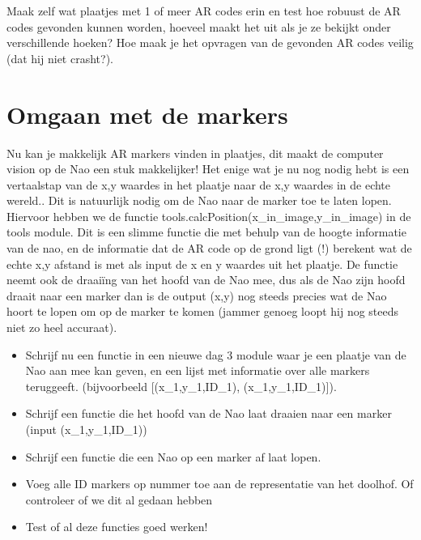 \documentclass[a4paper]{article}
\begin{document}
\begin{Exercise}
Maak zelf wat plaatjes met 1 of meer AR codes erin en test hoe robuust de AR codes gevonden kunnen worden, hoeveel maakt het uit als je ze bekijkt onder verschillende hoeken? Hoe maak je het opvragen van de gevonden AR codes veilig (dat hij niet crasht?). 
\end{Exercise}
\vspace{10 mm}

\section{Omgaan met de markers}

Nu kan je makkelijk AR markers vinden in plaatjes, dit maakt de computer vision op de Nao een stuk makkelijker! Het enige wat je nu nog nodig hebt is een vertaalstap van de x,y waardes in het plaatje naar de x,y waardes in de echte wereld.. Dit is natuurlijk nodig om de Nao naar de marker toe te laten lopen. Hiervoor hebben we de functie tools.calcPosition(x\_in\_image,y\_in\_image) in de tools module. Dit is een slimme functie die met behulp van de hoogte informatie van de nao, en de informatie dat de AR code op de grond ligt (!) berekent wat de echte x,y afstand is met als input de x en y waardes uit het plaatje. De functie neemt ook de draaiïng van het hoofd van de Nao mee, dus als de Nao zijn hoofd draait naar een marker dan is de output (x,y) nog steeds precies wat de Nao hoort te lopen om op de marker te komen (jammer genoeg loopt hij nog steeds niet zo heel accuraat).

\begin{Exercise}
\begin{itemize}
\item Schrijf nu een functie in een nieuwe dag 3 module waar je een plaatje van de Nao aan mee kan geven, en een lijst met informatie over alle markers teruggeeft. (bijvoorbeeld [(x\_1,y\_1,ID\_1), (x\_1,y\_1,ID\_1)]).
\item Schrijf een functie die het hoofd van de Nao laat draaien naar een marker (input (x\_1,y\_1,ID\_1))
\item Schrijf een functie die een Nao op een marker af laat lopen.
\item Voeg alle ID markers op nummer toe aan de representatie van het doolhof. Of controleer of we dit al gedaan hebben
\item Test of al deze functies goed werken!
\end{itemize}
\end{Exercise}
\vspace{10 mm}
\end{document}
